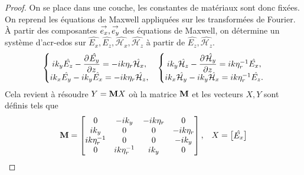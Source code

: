       \begin{proof}
        On se place dans une couche, les constantes de matériaux sont donc fixées.
        On reprend les équations de Maxwell appliquées sur les transformées de Fourier. À partir des composantes \(\vect{e_x},\vect{e_y}\) des équations de Maxwell, on  détermine un système d'\glspl{acr-edo} sur \(\hat{E_x},\hat{E_z},\hat{\mathcal{H}_x},\hat{\mathcal{H}_z}\) à partir de \(\hat{E_z}, \hat{\mathcal{H}_z}\).
        \begin{align*}
            \left\lbrace
            \begin{matrix}
                ik_y \hat{E_z}  - \ddr{z}{\hat{E_y}} = -i k \eta_r  \hat{\mathcal{H}_x},
                \\
                ik_x \hat{E_y} - ik_y \hat{E_x} = -i k \eta_r  \hat{\mathcal{H}_z},
            \end{matrix}
            \right. 
            &&
            \left\lbrace
            \begin{matrix}
                ik_y \hat{\mathcal{H}_z}  - \ddr{z}{\hat{\mathcal{H}_y}} = i k \eta_r^{-1} \hat{E_x},
                \\
                ik_x \hat{\mathcal{H}_y} - ik_y \hat{\mathcal{H}_x} = i k \eta_r^{-1} \hat{E_z}.
            \end{matrix}
            \right.
        \end{align*}
        Cela revient à résoudre \(Y = \mat{M}X\) où la matrice \(\mat{M}\) et les vecteurs \(X, Y\) sont définis tels que
        \begin{align*}
          \mat{M} =
          \begin{bmatrix}
          0 & -ik_y & -ik \eta_r & 0
          \\
          ik_y & 0 & 0 & -ik \eta_r
          \\
          ik \eta_r^{-1} & 0 & 0 & -ik_y
          \\
          0 & ik \eta_r^{-1} & ik_y & 0
          \end{bmatrix},
          &&
          X =
          \begin{bmatrix}
            \hat{E_x}\\

\end{bmatrix}
\end{align*}
\end{proof}

